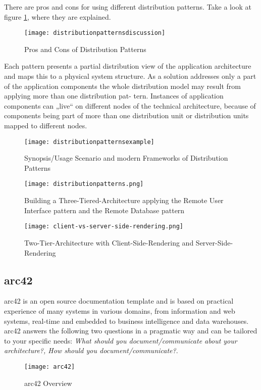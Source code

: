 There are pros and cons for using different distribution patterns. Take a look at figure \ref{fig:dpatternsdiscussion}, where they are explained.

\begin{figure}[H]
  \center
  \texttt{[image: distributionpatternsdiscussion]}
  \caption{Pros and Cons of Distribution Patterns}
  \label{fig:dpatternsdiscussion}
\end{figure}

Each pattern presents a partial distribution view of the application architecture and maps this to a physical system structure. As a solution addresses only a part of the application components the whole distribution model may result from applying more than one distribution pat- tern. Instances of application components can „live“ on different nodes of the technical architecture, because of components being part of more than one distribution unit or distribution units mapped to different nodes.

\begin{figure}[H]
  \center
  \texttt{[image: distributionpatternsexample]}
  \caption{Synopsis/Usage Scenario and modern Frameworks of Distribution Patterns}
  \label{fig:dpatternexample}
\end{figure}

\begin{figure}[H]
  \center
  \texttt{[image: distributionpatterns.png]}
  \caption{Building a Three-Tiered-Architecture applying the Remote User Interface pattern and the Remote Database pattern}
\end{figure}

\begin{figure}[H]
  \center
  \texttt{[image: client-vs-server-side-rendering.png]}
  \caption{Two-Tier-Architecture with Client-Side-Rendering and Server-Side-Rendering}
\end{figure}

\subsection{arc42}
arc42 is an open source documentation template and is based on practical experience of many systems in various domains, from information and web systems, real-time and embedded to business intelligence and data warehouses. arc42 answers the following two questions in a pragmatic way and can be tailored to your specific needs: \textit{What should you document/communicate about your architecture?,  How should you document/communicate?}.

\begin{figure}[H]
  \center
  \texttt{[image: arc42]}
  \caption{arc42 Overview}
\end{figure}
